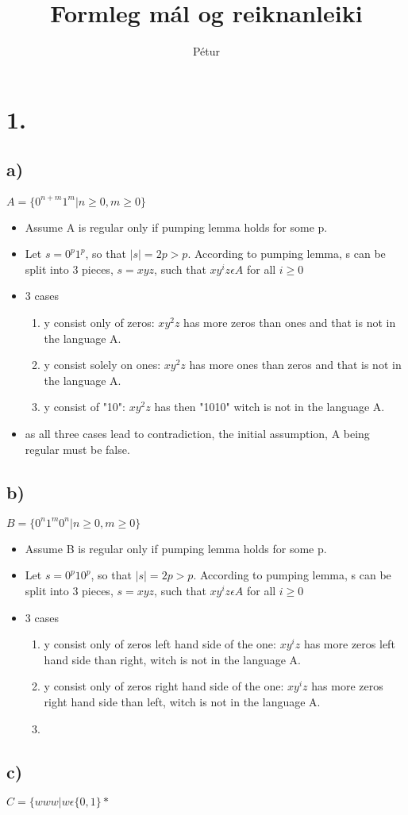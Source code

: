 \documentclass[]{article}
\begin{document}
\title{Formleg mál og reiknanleiki}
\author{Pétur}
\maketitle

\section*{1.}

\subsection*{a)}
$A = \{0^{n+m}1^{m}| n \geq 0, m \geq 0 \}$ \\
\begin{itemize}
	\item Assume A is regular only if pumping lemma holds for some p.
	\item Let $s = 0^{p}1^{p}$, so that $|s| = 2p > p$.
	 According to pumping lemma, s can be split into 3 pieces, $s=xyz$, such that $xy^{i}z \epsilon A$ for all $i \geq 0$
	\item 3 cases
	\begin{enumerate}
		\item y consist only of zeros: $xy^{2}z$ has more zeros than ones and that is not in the language A.
		\item y consist solely on ones: $xy^{2}z$  has more ones than zeros and that is not in the language A.
		\item y consist of "10": $xy^{2}z$ has then "1010" witch is not in the language A.
	\end{enumerate}
	\item as all three cases lead to contradiction, the initial assumption, A being regular must be false.
\end{itemize}

\subsection*{b)}
$B = \{0^{n}1^{m}0^{n}|n \geq 0, m \geq 0\}$

\begin{itemize}
	\item Assume B is regular only if pumping lemma holds for some p.
	\item Let $s = 0^{p}10^{p}$, so that $|s| = 2p > p$. According to pumping lemma, s can be split into 3 pieces, $s = xyz$, such that $xy^{i}z \epsilon A$ for all $i\ge0$
	\item 3 cases
	\begin{enumerate}
		\item y consist only of zeros left hand side of the one: $xy^{i}z$ has more zeros left hand side than right, witch is not in the language A.
		\item y consist only of zeros right hand side of the one: $xy^{i}z$ has more zeros right hand side than left, witch is not in the language A.
		\item 
		 
	\end{enumerate}
\end{itemize}

\subsection*{c)}
$C = \{www|w\epsilon \{0,1\}*$
\end{document}
